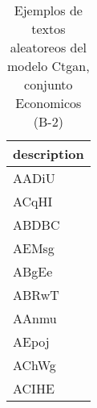 \begin{table}[H]
\centering
\fontsize{8}{14}\selectfont
\caption{Ejemplos de textos aleatoreos del modelo Ctgan, conjunto Economicos (B-2)}
\label{table-sample10-economicos-b-2-ctgan-text}
\begin{tabular}{|m{50em}|}
\hline
\rowcolor[gray]{0.8}
description \\
\hline AADiU \\
\hline ACqHI \\
\hline ABDBC \\
\hline AEMsg \\
\hline ABgEe \\
\hline ABRwT \\
\hline AAnmu \\
\hline AEpoj \\
\hline AChWg \\
\hline ACIHE \\
\hline
\end{tabular}
\end{table}
